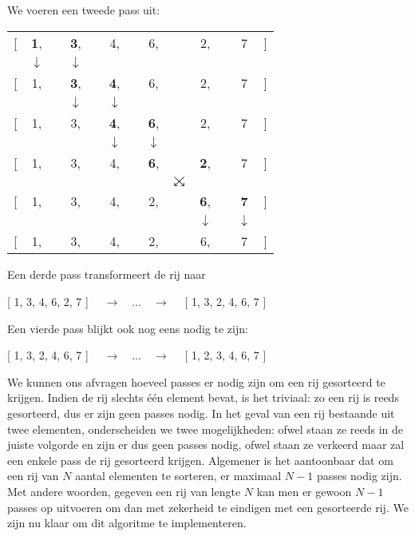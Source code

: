 \begin{example} \label{example:sorteren:passes}
We voeren een tweede pass uit:
{
\newcommand{\HL}[1]{\textbf{#1}}
\newcommand{\swap}{\ensuremath{\searrow\kern-10pt\swarrow}}
\newcommand{\keep}{\ensuremath{\downarrow}}
\begin{center}
  \begin{tabular}{rcccccccccccl}
    {[} & \HL1, && \HL3, && 4, && 6, && 2, && 7 & ] \\
    & \keep & \phantom{\swap} & \keep & \phantom{\swap} && \phantom{\swap} && \phantom{\swap} && \phantom{\swap} \\
    {[} & 1, && \HL3, && \HL4, && 6, && 2, && 7 & ] \\
    &&& \keep && \keep \\
    {[} & 1, && 3, && \HL4, && \HL6, && 2, && 7 & ] \\
    &&&&& \keep && \keep \\
    {[} & 1, && 3, && 4, && \HL6, && \HL2, && 7 & ] \\
    &&&&&&&& \swap \\
    {[} & 1, && 3, && 4, && 2, && \HL6, && \HL7 & ] \\
    &&&&&&&&& \keep && \keep \\
    {[} & 1, && 3, && 4, && 2, && 6, && 7 & ]
  \end{tabular}
\end{center}}
{\flushleft Een derde pass transformeert de rij naar}
\begin{center}
  [ 1, 3, 4, 6, 2, 7 ] $\quad\rightarrow\quad \dots \quad\rightarrow\quad$ [ 1, 3, 2, 4, 6, 7 ]
\end{center}
Een vierde pass blijkt ook nog eens nodig te zijn:
\begin{center}
  [ 1, 3, 2, 4, 6, 7 ] $\quad\rightarrow\quad \dots \quad\rightarrow\quad$ [ 1, 2, 3, 4, 6, 7 ]
\end{center}
\end{example}
We kunnen ons afvragen hoeveel passes er nodig zijn om een rij gesorteerd te krijgen.
Indien de rij slechts \'e\'en element bevat, is het triviaal: zo een rij is reeds gesorteerd,
dus er zijn geen passes nodig.
In het geval van een rij bestaande uit twee elementen, onderscheiden we twee mogelijkheden:
ofwel staan ze reeds in de juiste volgorde en zijn er dus geen passes nodig,
ofwel staan ze verkeerd maar zal een enkele pass de rij gesorteerd krijgen.
Algemener is het aantoonbaar dat om een rij van $N$ aantal elementen te sorteren,
er maximaal $N - 1$ passes nodig zijn.
Met andere woorden, gegeven een rij van lengte $N$ kan men er gewoon $N-1$ passes op
uitvoeren om dan met zekerheid te eindigen met een gesorteerde rij.
We zijn nu klaar om dit algoritme te implementeren.

